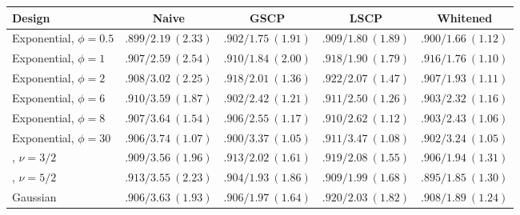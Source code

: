 \begin{tabular}{lcccc}
\toprule
Design & Naive & GSCP & LSCP & Whitened\\
\midrule
Exponential, $\phi=0.5$ & $.899/2.19\ (2.33)$ & $.902/1.75\ (1.91)$ & $.909/1.80\ (1.89)$ & $.900/\mathbf{1.66}\ (\mathbf{1.12})$\\
Exponential, $\phi=1$ & $.907/2.59\ (2.54)$ & $.910/1.84\ (2.00)$ & $.918/1.90\ (1.79)$ & $.916/\mathbf{1.76}\ (\mathbf{1.10})$\\
Exponential, $\phi=2$ & $.908/3.02\ (2.25)$ & $.918/2.01\ (1.36)$ & $.922/2.07\ (1.47)$ & $.907/\mathbf{1.93}\ (\mathbf{1.11})$\\
Exponential, $\phi=6$ & $.910/3.59\ (1.87)$ & $.902/2.42\ (1.21)$ & $.911/2.50\ (1.26)$ & $.903/\mathbf{2.32}\ (\mathbf{1.16})$\\
Exponential, $\phi=8$ & $.907/3.64\ (1.54)$ & $.906/2.55\ (1.17)$ & $.910/2.62\ (1.12)$ & $.903/\mathbf{2.43}\ (\mathbf{1.06})$\\
Exponential, $\phi=30$ & $.906/3.74\ (1.07)$ & $.900/3.37\ (\mathbf{1.05})$ & $.911/3.47\ (1.08)$ & $.902/\mathbf{3.24}\ (\mathbf{1.05})$\\
\Matern{}, $\nu=3/2$ & $.909/3.56\ (1.96)$ & $.913/2.02\ (1.61)$ & $.919/2.08\ (1.55)$ & $.906/\mathbf{1.94}\ (\mathbf{1.31})$\\
\Matern{}, $\nu=5/2$ & $.913/3.55\ (2.23)$ & $.904/1.93\ (1.86)$ & $.909/1.99\ (1.68)$ & $.895/\mathbf{1.85}\ (\mathbf{1.30})$\\
Gaussian & $.906/3.63\ (1.93)$ & $.906/1.97\ (1.64)$ & $.920/2.03\ (1.82)$ & $.908/\mathbf{1.89}\ (\mathbf{1.24})$\\
\bottomrule
\end{tabular}
